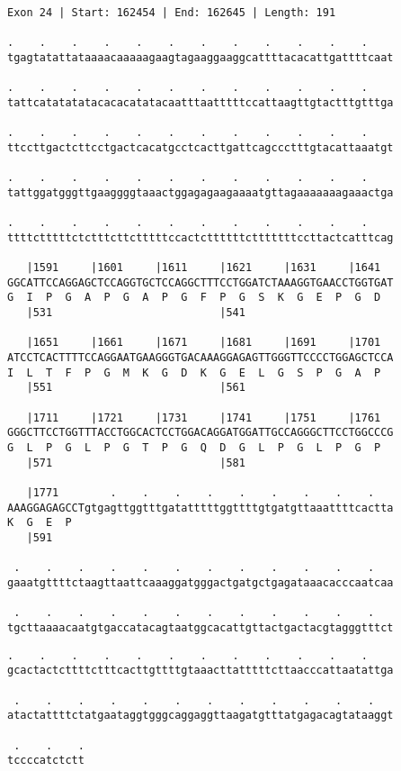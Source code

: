 \documentclass{article}
\begin{document}
\begin{Verbatim}[fontfamily=courier]
Exon 24 | Start: 162454 | End: 162645 | Length: 191

.    .    .    .    .    .    .    .    .    .    .    .    
tgagtatattataaaacaaaaagaagtagaaggaaggcattttacacattgattttcaat

.    .    .    .    .    .    .    .    .    .    .    .    
tattcatatatatacacacatatacaatttaatttttccattaagttgtactttgtttga

.    .    .    .    .    .    .    .    .    .    .    .    
ttccttgactcttcctgactcacatgcctcacttgattcagccctttgtacattaaatgt

.    .    .    .    .    .    .    .    .    .    .    .    
tattggatgggttgaaggggtaaactggagagaagaaaatgttagaaaaaaagaaactga

.    .    .    .    .    .    .    .    .    .    .    .    
ttttctttttctctttcttctttttccactcttttttctttttttccttactcatttcag

   |1591     |1601     |1611     |1621     |1631     |1641  
GGCATTCCAGGAGCTCCAGGTGCTCCAGGCTTTCCTGGATCTAAAGGTGAACCTGGTGAT
G  I  P  G  A  P  G  A  P  G  F  P  G  S  K  G  E  P  G  D  
   |531                          |541                       

   |1651     |1661     |1671     |1681     |1691     |1701  
ATCCTCACTTTTCCAGGAATGAAGGGTGACAAAGGAGAGTTGGGTTCCCCTGGAGCTCCA
I  L  T  F  P  G  M  K  G  D  K  G  E  L  G  S  P  G  A  P  
   |551                          |561                       

   |1711     |1721     |1731     |1741     |1751     |1761  
GGGCTTCCTGGTTTACCTGGCACTCCTGGACAGGATGGATTGCCAGGGCTTCCTGGCCCG
G  L  P  G  L  P  G  T  P  G  Q  D  G  L  P  G  L  P  G  P  
   |571                          |581                       

   |1771        .    .    .    .    .    .    .    .    .   
AAAGGAGAGCCTgtgagttggtttgatatttttggttttgtgatgttaaattttcactta
K  G  E  P                                                  
   |591                                                     

 .    .    .    .    .    .    .    .    .    .    .    .   
gaaatgttttctaagttaattcaaaggatgggactgatgctgagataaacacccaatcaa

 .    .    .    .    .    .    .    .    .    .    .    .   
tgcttaaaacaatgtgaccatacagtaatggcacattgttactgactacgtagggtttct

\end{Verbatim}
\newpage
\begin{Verbatim}[fontfamily=courier]
 .    .    .    .    .    .    .    .    .    .    .    .   
gcactactcttttctttcacttgttttgtaaacttatttttcttaacccattaatattga

 .    .    .    .    .    .    .    .    .    .    .    .   
atactattttctatgaataggtgggcaggaggttaagatgtttatgagacagtataaggt

 .    .    .
tccccatctctt
\end{Verbatim}
\end{document}
